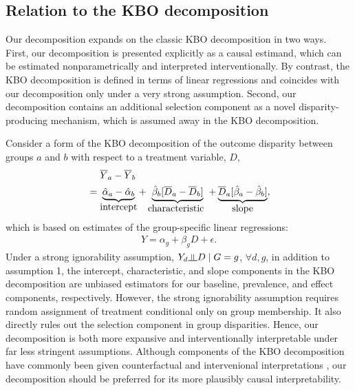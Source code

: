 \documentclass[12pt,a4paper]{article}
\newcommand{\indep}{\rotatebox[origin=c]{90}{$\models$}}  %
\begin{document}
\subsection{Relation to the KBO decomposition}
Our decomposition expands on the classic KBO decomposition in two ways. First, our decomposition is presented explicitly as a causal estimand, which can be estimated nonparametrically and interpreted interventionally. 
By contrast, the KBO decomposition is defined in terms of linear regressions and coincides with our decomposition only under a very strong assumption. Second, our decomposition contains an additional selection component as a novel disparity-producing mechanism, which is assumed away in the KBO decomposition. 

Consider a form of the KBO decomposition of the outcome disparity between groups $a$ and $b$ with respect to a treatment variable, $D$, 
\begin{align*}
&\phantom{{}={}} \overline{Y}_a-\overline{Y}_b   \nonumber  \\
&= \underbrace{ \hat{\alpha}_a-\hat{\alpha}_b }_{\text{\normalsize intercept}}
+ \underbrace{\hat{\beta}_b [\overline{D}_a-\overline{D}_b]}_{\text{\normalsize characteristic }}
+ \underbrace{\overline{D}_a[ \hat{\beta}_a - \hat{\beta}_b ]}_{\text{\normalsize slope}},
\end{align*}
which is based on estimates of the group-specific linear regressions:
\begin{gather*}
Y=\alpha_g+\beta_g D + \epsilon.
\end{gather*}
Under a strong ignorability assumption, $Y_d \indep D \mid  G=g$, $\forall d, g$, in addition to assumption 1, the intercept, characteristic, and slope components in the KBO decomposition are unbiased estimators for our baseline, prevalence, and effect components, respectively. However, the strong ignorability assumption requires random assignment of treatment conditional only on group membership. It also directly rules out the selection component in group disparities. Hence, our decomposition is both more expansive and interventionally interpretable under far less stringent assumptions. Although components of the KBO decomposition have commonly been given counterfactual and intervenional interpretations \citep[e.g.,][]{jann_blinderoaxaca_2008}, our decomposition should be preferred for its more plausibly causal interpretability.  
\end{document}

